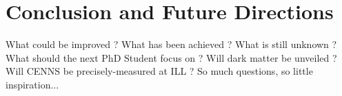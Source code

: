 
\chapter{Conclusion and Future Directions} %

\label{ChapterConclusion} %


What could be improved ?
What has been achieved ?
What is still unknown ?
What should the next PhD Student focus on ?
Will dark matter be unveiled ?
Will CENNS be precisely-measured at ILL ?
So much questions, so little inspiration...